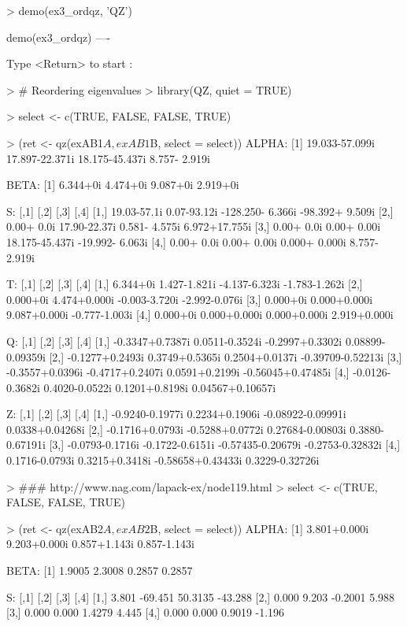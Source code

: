 \begin{Code}[title=QZ demo ex3\_ordqz]
> demo(ex3_ordqz, 'QZ')


	demo(ex3_ordqz)
	---- ~~~~~~~~~

Type  <Return>	 to start : 

> # Reordering eigenvalues
> library(QZ, quiet = TRUE)

> select <- c(TRUE, FALSE, FALSE, TRUE)

> (ret <- qz(exAB1$A, exAB1$B, select = select))
ALPHA:
[1] 19.033-57.099i 17.897-22.371i 18.175-45.437i  8.757- 2.919i

BETA:
[1] 6.344+0i 4.474+0i 9.087+0i 2.919+0i

S:
            [,1]         [,2]             [,3]            [,4]
[1,] 19.03-57.1i  0.07-93.12i -128.250- 6.366i -98.392+ 9.509i
[2,]  0.00+ 0.0i 17.90-22.37i    0.581- 4.575i   6.972+17.755i
[3,]  0.00+ 0.0i  0.00+ 0.00i   18.175-45.437i -19.992- 6.063i
[4,]  0.00+ 0.0i  0.00+ 0.00i    0.000+ 0.000i   8.757- 2.919i

T:
         [,1]         [,2]          [,3]          [,4]
[1,] 6.344+0i 1.427-1.821i -4.137-6.323i -1.783-1.262i
[2,] 0.000+0i 4.474+0.000i -0.003-3.720i -2.992-0.076i
[3,] 0.000+0i 0.000+0.000i  9.087+0.000i -0.777-1.003i
[4,] 0.000+0i 0.000+0.000i  0.000+0.000i  2.919+0.000i

Q:
                [,1]            [,2]            [,3]              [,4]
[1,] -0.3347+0.7387i  0.0511-0.3524i -0.2997+0.3302i  0.08899-0.09359i
[2,] -0.1277+0.2493i  0.3749+0.5365i  0.2504+0.0137i -0.39709-0.52213i
[3,] -0.3557+0.0396i -0.4717+0.2407i  0.0591+0.2199i -0.56045+0.47485i
[4,] -0.0126-0.3682i  0.4020-0.0522i  0.1201+0.8198i  0.04567+0.10657i

Z:
                [,1]            [,2]              [,3]             [,4]
[1,] -0.9240-0.1977i  0.2234+0.1906i -0.08922-0.09991i  0.0338+0.04268i
[2,] -0.1716+0.0793i -0.5288+0.0772i  0.27684-0.00803i  0.3880-0.67191i
[3,] -0.0793-0.1716i -0.1722-0.6151i -0.57435-0.20679i -0.2753-0.32832i
[4,]  0.1716-0.0793i  0.3215+0.3418i -0.58658+0.43433i  0.3229-0.32726i

> ### http://www.nag.com/lapack-ex/node119.html
> select <- c(TRUE, FALSE, FALSE, TRUE)

> (ret <- qz(exAB2$A, exAB2$B, select = select))
ALPHA:
[1] 3.801+0.000i 9.203+0.000i 0.857+1.143i 0.857-1.143i

BETA:
[1] 1.9005 2.3008 0.2857 0.2857

S:
      [,1]    [,2]    [,3]    [,4]
[1,] 3.801 -69.451 50.3135 -43.288
[2,] 0.000   9.203 -0.2001   5.988
[3,] 0.000   0.000  1.4279   4.445
[4,] 0.000   0.000  0.9019  -1.196


\end{Code}
